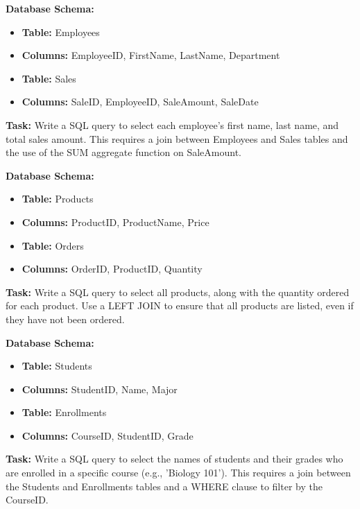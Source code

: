 \begin{exercisebox}
\noindent \textbf{Database Schema:}
\begin{itemize}
    \item \textbf{Table:} Employees
    \item \textbf{Columns:} EmployeeID, FirstName, LastName, Department
    \item \textbf{Table:} Sales
    \item \textbf{Columns:} SaleID, EmployeeID, SaleAmount, SaleDate
\end{itemize}

\noindent \textbf{Task:} Write a SQL query to select each employee's first name, last name, and total sales amount. This requires a join between Employees and Sales tables and the use of the SUM aggregate function on SaleAmount.\\
\end{exercisebox}

\begin{exercisebox}
\noindent \textbf{Database Schema:}
\begin{itemize}
    \item \textbf{Table:} Products
    \item \textbf{Columns:} ProductID, ProductName, Price
    \item \textbf{Table:} Orders
    \item \textbf{Columns:} OrderID, ProductID, Quantity
\end{itemize}

\noindent \textbf{Task:} Write a SQL query to select all products, along with the quantity ordered for each product. Use a LEFT JOIN to ensure that all products are listed, even if they have not been ordered.\\
\end{exercisebox}

\begin{exercisebox}
\noindent \textbf{Database Schema:}
\begin{itemize}
    \item \textbf{Table:} Students
    \item \textbf{Columns:} StudentID, Name, Major
    \item \textbf{Table:} Enrollments
    \item \textbf{Columns:} CourseID, StudentID, Grade
\end{itemize}

\noindent \textbf{Task:} Write a SQL query to select the names of students and their grades who are enrolled in a specific course (e.g., 'Biology 101'). This requires a join between the Students and Enrollments tables and a WHERE clause to filter by the CourseID.\\
\end{exercisebox}

